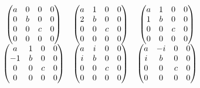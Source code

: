 \begin{frame} 
    \frametitle{} 
    $$\begin{matrix}
        \begin{pmatrix}
            a & 0 & 0 & 0 \\
            0 & b & 0 & 0 \\
            0 & 0 & c & 0\\
            0 & 0 & 0 & 0 \\
         \end{pmatrix} 
         &  
         \begin{pmatrix}
            a & 1 & 0 & 0 \\
            2 & b & 0 & 0 \\
            0 & 0 & c & 0\\
            0 & 0 & 0 & 0 \\
         \end{pmatrix} 
         & 
         \begin{pmatrix}
            a & 1 & 0 & 0 \\
            1 & b & 0 & 0 \\
            0 & 0 & c & 0 \\
            0 & 0 & 0 & 0 \\
         \end{pmatrix} 
         \\ \vspace{0.6em}
         \begin{pmatrix}
            a & 1 & 0 & 0 \\
            -1 & b & 0 & 0 \\
            0 & 0 & c & 0 \\
            0 & 0 & 0 & 0 \\
         \end{pmatrix} 
         &     
        \begin{pmatrix}
            a & i & 0 & 0 \\
            i & b & 0 & 0 \\
            0 & 0 & c & 0 \\
            0 & 0 & 0 & 0 \\
        \end{pmatrix} 
         &   
         \begin{pmatrix}
            a & -i & 0 & 0 \\
            i & b & 0 & 0 \\
            0 & 0 & c & 0 \\
            0 & 0 & 0 & 0 \\
         \end{pmatrix} 
    \end{matrix}
        $$
\end{frame}


